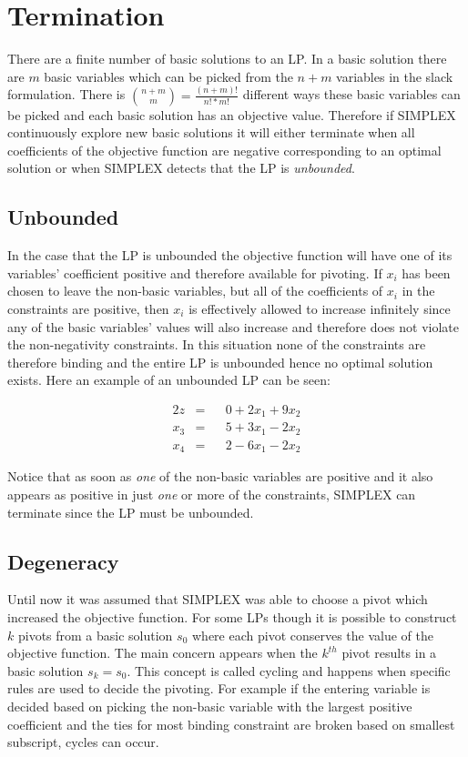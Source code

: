 \section{Termination}
There are a finite number of basic solutions to an LP. In a basic solution there are $m$ basic variables which can be picked from the $n + m$ variables in the slack formulation. There is ${{n+m}\choose{m}} = \frac{(n+m)!}{n!*m!}$ different ways these basic variables can be picked and each basic solution has an objective value. Therefore if SIMPLEX continuously explore new basic solutions it will either terminate when all coefficients of the objective function are negative corresponding to an optimal solution or when SIMPLEX detects that the LP is \textit{unbounded}. 

\subsection{Unbounded}
In the case that the LP is unbounded the objective function will have one of its variables' coefficient positive and therefore available for pivoting. If $x_i$ has been chosen to leave the non-basic variables, but all of the coefficients of $x_i$ in the constraints are positive, then $x_i$ is effectively allowed to increase infinitely since any of the basic variables' values will also increase and therefore does not violate the non-negativity constraints. In this situation none of the constraints are therefore binding and the entire LP is unbounded hence no optimal solution exists. Here an example of an unbounded LP can be seen:

\begin{alignat}{2}
z        &= && 0 + 2 x_1 + 9x_2\\
x_3      &= && 5 + 3 x_1 - 2x_2\\
x_4      &= && 2 - 6 x_1 - 2x_2
\end{alignat}

Notice that as soon as \textit{one} of the non-basic variables are positive and it also appears as positive in just \textit{one} or more of the constraints, SIMPLEX can terminate since the LP must be unbounded.

\subsection{Degeneracy}
Until now it was assumed that SIMPLEX was able to choose a pivot which increased the objective function. For some LPs though it is possible to construct $k$ pivots from a basic solution $s_0$ where each pivot conserves the value of the objective function. The main concern appears when the $k^{th}$ pivot results in a basic solution $s_k = s_0$. This concept is called cycling and happens when specific rules are used to decide the pivoting. For example if the entering variable is decided based on picking the non-basic variable with the largest positive coefficient and the ties for most binding constraint are broken based on smallest subscript, cycles can occur. 

